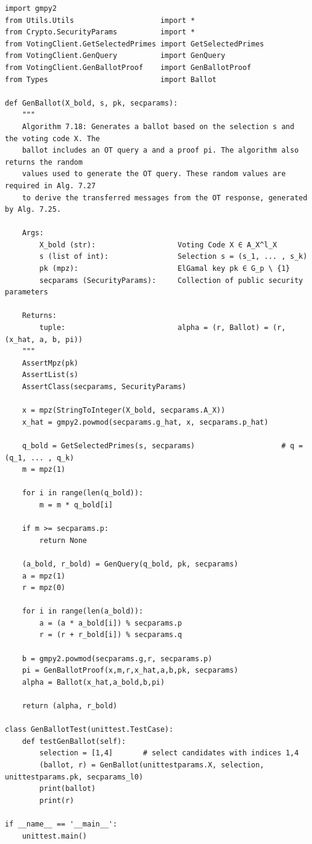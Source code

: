 \begin{verbatim}
import gmpy2
from Utils.Utils                    import *
from Crypto.SecurityParams          import *
from VotingClient.GetSelectedPrimes import GetSelectedPrimes
from VotingClient.GenQuery          import GenQuery
from VotingClient.GenBallotProof    import GenBallotProof
from Types                          import Ballot

def GenBallot(X_bold, s, pk, secparams):
    """
    Algorithm 7.18: Generates a ballot based on the selection s and the voting code X. The
    ballot includes an OT query a and a proof pi. The algorithm also returns the random
    values used to generate the OT query. These random values are required in Alg. 7.27
    to derive the transferred messages from the OT response, generated by Alg. 7.25.

    Args:
        X_bold (str):                   Voting Code X ∈ A_X^l_X
        s (list of int):                Selection s = (s_1, ... , s_k)
        pk (mpz):                       ElGamal key pk ∈ G_p \ {1}
        secparams (SecurityParams):     Collection of public security parameters

    Returns:
        tuple:                          alpha = (r, Ballot) = (r, (x_hat, a, b, pi))
    """
    AssertMpz(pk)
    AssertList(s)
    AssertClass(secparams, SecurityParams)

    x = mpz(StringToInteger(X_bold, secparams.A_X))
    x_hat = gmpy2.powmod(secparams.g_hat, x, secparams.p_hat)

    q_bold = GetSelectedPrimes(s, secparams)                    # q = (q_1, ... , q_k)
    m = mpz(1)

    for i in range(len(q_bold)):
        m = m * q_bold[i]

    if m >= secparams.p:
        return None

    (a_bold, r_bold) = GenQuery(q_bold, pk, secparams)
    a = mpz(1)
    r = mpz(0)

    for i in range(len(a_bold)):
        a = (a * a_bold[i]) % secparams.p
        r = (r + r_bold[i]) % secparams.q

    b = gmpy2.powmod(secparams.g,r, secparams.p)
    pi = GenBallotProof(x,m,r,x_hat,a,b,pk, secparams)
    alpha = Ballot(x_hat,a_bold,b,pi)

    return (alpha, r_bold)

class GenBallotTest(unittest.TestCase):
    def testGenBallot(self):
        selection = [1,4]       # select candidates with indices 1,4
        (ballot, r) = GenBallot(unittestparams.X, selection, unittestparams.pk, secparams_l0)
        print(ballot)
        print(r)

if __name__ == '__main__':
    unittest.main()
\end{verbatim}

